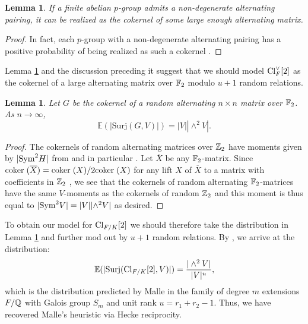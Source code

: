 \documentclass[11pt,a4paper]{amsart}
\def\F{{\rm \mathbb{F}}}
\def\Z{{\rm \mathbb{Z}}}
\def\Q{{\rm \mathbb{Q}}}
\def\Cl{{\rm Cl}}
\def\Sym{{\rm Sym}}
\def\coker{{\rm coker \hspace{1mm}}}
\numberwithin{equation}{section}
\newtheorem{lemma}[theorem]{Lemma}
\begin{document}
\begin{lemma}\label{lem: alternating}
    If a finite abelian $p$-group admits a non-degenerate alternating pairing, it can be realized as the cokernel of some large enough alternating matrix.
\end{lemma}
\begin{proof}
    In fact, each $p$-group with a non-degenerate alternating pairing has a positive probability of being realized as such a cokernel \cite[Theorem 3.9]{BhargavaKaneLenstraPoonenRains}.
\end{proof}

Lemma \ref{lem: alternating} and the discussion preceding it suggest that we should model $\Cl^\vee_F[2]$ as the cokernel of a large alternating matrix over $\F_2$ modulo $u+1$ random relations. 

\begin{lemma}\label{lem: alternating distribution}
    Let $G$ be the cokernel of a random alternating $n \times n$ matrix over $\F_2$. As $n \to \infty$, 
\begin{equation} \label{eqn: symmetric moments}
    \mathbb{E}(|\mathrm{Surj}(G,V)|) = |V|| \wedge^2 V|.
\end{equation}
\end{lemma}
\begin{proof}
    The cokernels of random alternating matrices over $\Z_2$ have moments given by $\lvert \Sym^2 H \rvert$ from \cite{BhargavaKaneLenstraPoonenRains} and in particular \cite[\S 4.1]{NguyenWood}. Let $\overline{X}$ be any $\F_2$-matrix. Since $\coker(\overline{X}) = \coker(X)/2\coker(X)$ for any lift $X$ of $\overline{X}$ to a matrix with coefficients in $\Z_2$ \cite[Lemma 2.25.]{DasZhangShiqiao}, we see that the cokernels of random alternating $\F_2$-matrices have the same $V$-moments as the cokernels of random $\Z_2$ and this moment is thus equal to $\lvert \Sym^2 V \rvert = \lvert V \rvert \lvert \wedge^2 V \rvert$ as desired. 
\end{proof}

To obtain our model for $\Cl_{F/K}[2]$ we should therefore take the distribution in Lemma \ref{lem: alternating distribution} and further mod out by $u+1$ random relations.  By \cite[proof of Lemma 8.12.]{LipnowskiSawinTsimerman}, we arrive at the distribution:
\begin{equation} \label{eqn: Malle}
    \mathbb{E}(|\mathrm{Surj}(\Cl_{F/K}[2],V)|) = \dfrac{| \wedge^2 V|}{|V|^u},
\end{equation}
which is the distribution predicted by Malle in the family of degree $m$ extensions $F/\Q$ with Galois group $S_m$ and unit rank $u = r_1 + r_2 - 1$. Thus, we have recovered Malle's heuristic via Hecke reciprocity. 
\end{document}
